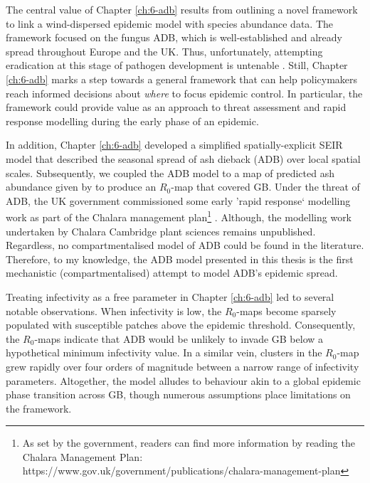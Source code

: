 The central value of Chapter \ref{ch:6-adb} results from outlining a novel framework to link a wind-dispersed epidemic model with species abundance data. 
The framework focused on the fungus ADB, which is well-established and already spread throughout Europe and the UK.
Thus, unfortunately, attempting eradication at this stage of pathogen development is untenable \cite{ash-dieback-costs}. 
Still, Chapter \ref{ch:6-adb} marks a step towards a general framework that can help policymakers reach informed decisions about \textit{where} to focus epidemic control.
In particular, the framework could provide value as an approach to threat assessment and rapid response modelling during the early phase of an epidemic.

In addition, Chapter \ref{ch:6-adb} developed a simplified spatially-explicit SEIR model that described the seasonal spread of ash dieback (ADB) over local spatial scales. Subsequently, we coupled the ADB model to a map of predicted ash abundance given by \cite{hill.data} to produce an $R_0$-map that covered GB.
Under the threat of ADB, the UK government commissioned some early 'rapid response` modelling work as part of the Chalara management plan\footnote{As set by the government, readers can find more information by reading the Chalara Management Plan: https://www.gov.uk/government/publications/chalara-management-plan} \cite{defra2013chalara}. Although, the modelling work undertaken by  Chalara Cambridge plant sciences remains unpublished. Regardless, no compartmentalised model of ADB could be found in the literature. Therefore, to my knowledge, the ADB model presented in this thesis is the first mechanistic (compartmentalised) attempt to model ADB's epidemic spread.

Treating infectivity as a free parameter in Chapter \ref{ch:6-adb} led to several notable observations. When infectivity is low, the $R_0$-maps become sparsely populated with susceptible patches above the epidemic threshold. Consequently, the $R_0$-maps indicate that ADB would be unlikely to invade GB below a hypothetical minimum infectivity value.
In a similar vein, clusters in the $R_0$-map grew rapidly over four orders of magnitude between a narrow range of infectivity parameters.
Altogether, the model alludes to behaviour akin to a global epidemic phase transition across GB, though numerous assumptions place limitations on the framework.

